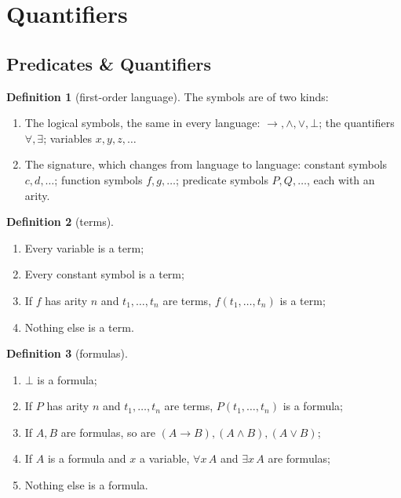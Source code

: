 \documentclass[a4paper, 11pt]{article}
\theoremstyle{definition}
\newtheorem{definition}{Definition}[section]
\begin{document}
\section{Quantifiers}

\subsection{Predicates \& Quantifiers}

\begin{definition}[first-order language]
    The symbols are of two kinds:
    \begin{enumerate}
        \item The logical symbols, the same in every language: $\to, \land, \lor, \bot$; the quantifiers $\forall,
        \exists$; variables $x, y, z, \dots$
        \item The signature, which changes from language to language: constant symbols $c, d, \dots$; function symbols
        $f, g, \dots$; predicate symbols $P, Q, \dots$, each with an arity.
    \end{enumerate}
\end{definition}

\begin{definition}[terms] \leavevmode
    \begin{enumerate}
        \item Every variable is a term;
        \item Every constant symbol is a term;
        \item If $f$ has arity $n$ and $t_1, \dots, t_n$ are terms, $f(t_1, \dots, t_n)$ is a term;
        \item Nothing else is a term.
    \end{enumerate}
\end{definition}

\begin{definition}[formulas] \leavevmode
    \begin{enumerate}
        \item $\bot$ is a formula;
        \item If $P$ has arity $n$ and $t_1, \dots, t_n$ are terms, $P(t_1, \dots, t_n)$ is a formula; 
        \item If $A, B$ are formulas, so are $(A \to B), (A \land B), (A \lor B)$; 
        \item If $A$ is a formula and $x$ a variable, $\forall x \, A$ and $\exists x \, A$ are formulas;
        \item Nothing else is a formula.
    \end{enumerate}
\end{definition}
\end{document}
